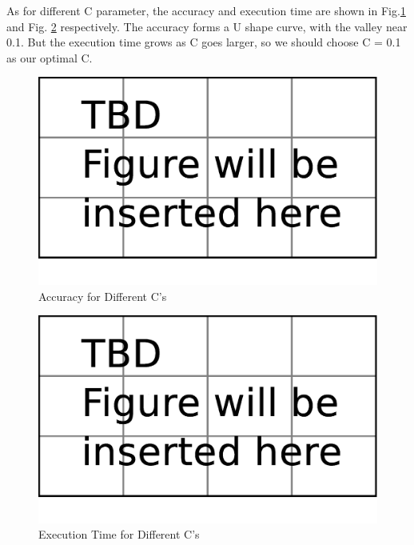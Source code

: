 As for different C parameter, the accuracy and execution time are shown in Fig.\ref{fig:c_accu} and Fig. \ref{fig:c_time} respectively. The accuracy forms a U shape curve, with the valley near 0.1. But the execution time grows as C goes larger, so we should choose C = 0.1 as our optimal C.

\begin{figure}[tp]
   \begin{center}
      \includegraphics[width=\textwidth]{fig/TBDFigure}

   \end{center}
   \caption{Accuracy for Different C's}
   \label{fig:c_accu}
\end{figure}
\begin{figure}[tp]
   \begin{center}
      \includegraphics[width=\textwidth]{fig/TBDFigure}

   \end{center}
   \caption{Execution Time for Different C's}
   \label{fig:c_time}
\end{figure}

